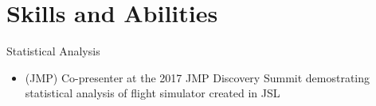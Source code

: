 \documentclass[]{friggeri-cv}
\begin{document}
\vspace{-2mm}

\section{Skills and Abilities}
\begin{entrylist}





    \entry
    {}
    {Statistical Analysis}
    {}
    {\vspace{-4mm}
    \begin{itemize}
    \item (JMP) Co-presenter at the 2017 JMP Discovery Summit demostrating statistical analysis of flight simulator created in JSL



\end{itemize}}
\end{entrylist}
\end{document}

